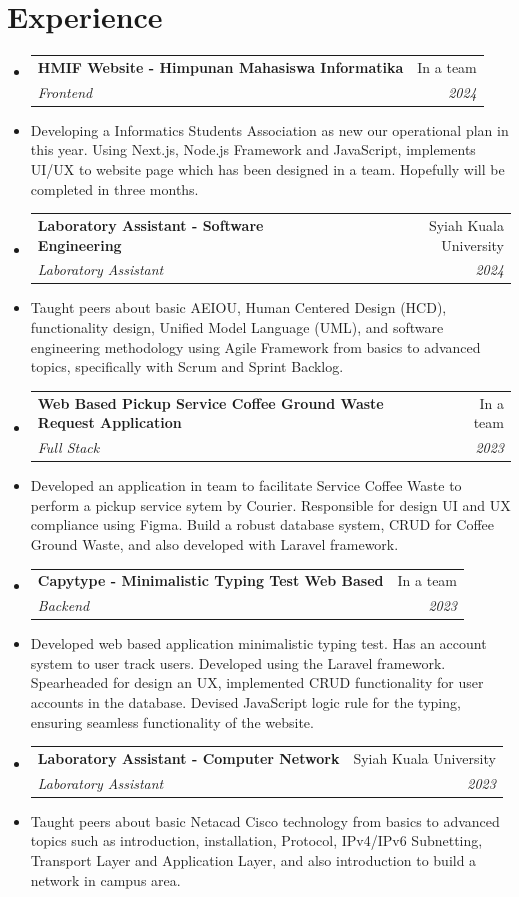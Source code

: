 \documentclass[letterpaper,10pt]{article}
\makeatletter
\newcommand{\resumeItem}[1]{
  \item\small{
    {#1 \vspace{-2pt}}
  }
}
\newcommand{\resumeSubheading}[4]{
  \vspace{-1pt}
  \item
  \begin{tabular*}{0.97\textwidth}{l@{\extracolsep{\fill}}r}
    \textbf{#1} & #2 \\
    \textit{\small#3} & \textit{\small #4} \\
  \end{tabular*}\vspace{-5pt}
}
\makeatother
\begin{document}
\section{Experience}
\begin{itemize}[leftmargin=0.15in, label={}]
  	\resumeSubheading{HMIF Website - Himpunan Mahasiswa Informatika}{In a team}{Frontend}{2024}
  	\resumeItem{Developing a Informatics Students Association as new our operational plan in this year. Using Next.js, Node.js Framework and JavaScript, implements UI/UX to website page which has been designed in a team. Hopefully will be completed in three months.}
	
    \resumeSubheading{Laboratory Assistant - Software Engineering}{Syiah Kuala University}{Laboratory Assistant}{2024}
    \resumeItem{Taught peers about basic AEIOU, Human Centered Design (HCD), functionality design, Unified Model Language (UML), and software engineering methodology using Agile Framework from basics to advanced topics, specifically with Scrum and Sprint Backlog.}
  \resumeSubheading{Web Based Pickup Service Coffee Ground Waste Request Application}{In a team}{Full Stack}{2023}
    \resumeItem{Developed an application in team to facilitate Service Coffee Waste to perform a pickup service sytem by Courier. Responsible for design UI and UX compliance using Figma. Build a robust database system, CRUD for Coffee Ground Waste, and also developed with Laravel framework.}
    \resumeSubheading{Capytype - Minimalistic Typing Test Web Based}{In a team}{Backend}{2023}
    \resumeItem{Developed web based application minimalistic typing test. Has an account system to user track users. Developed using the Laravel framework. Spearheaded for design an UX, implemented CRUD functionality for user accounts in the database. Devised JavaScript logic rule for the typing, ensuring seamless functionality of the website.}
    \resumeSubheading{Laboratory Assistant - Computer Network}{Syiah Kuala University}{Laboratory Assistant}{2023}
    \resumeItem{Taught peers about basic Netacad Cisco technology from basics to advanced topics such as introduction, installation, Protocol, IPv4/IPv6 Subnetting, Transport Layer and Application Layer, and also introduction to build a network in campus area.}
\end{itemize}

\end{document}
